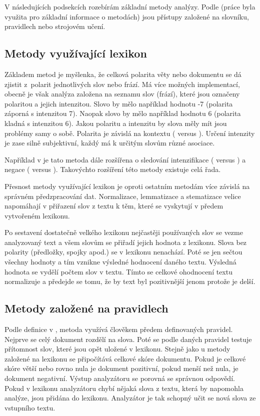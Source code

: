 V následujících podsekcích rozebírám základní metody analýzy. Podle \cite{approaches} (práce byla využita pro základní informace o metodách) jsou přístupy založené na slovníku, pravidlech nebo strojovém učení.


\subsection{Metody využívající lexikon}
Základem metod je myšlenka, že celková polarita věty nebo dokumentu se dá zjistit z~polarit jednotlivých slov nebo frází. Má více možných implementací, obecně je však analýza založena na seznamu slov (frází), které jsou označeny polaritou a jejich intenzitou. Slovo  by mělo například hodnotu -7 (polarita záporná s intenzitou 7). Naopak slovo  by mělo například hodnotu 6 (polarita kladná s intenzitou 6). 
Jakou polaritu a intenzitu by slova měly mít jsou problémy samy o sobě. Polarita je závislá na kontextu ( versus ). Určení intenzity je zase silně subjektivní, každý má k určitým slovům různé asociace.

Například v \cite{lexikon} je tato metoda dále rozšířena o sledování intenzifikace ( versus ) a negace ( versus ). Takovýchto rozšíření této metody existuje celá řada.

Přesnost metody využívající lexikon je oproti ostatním metodám více závislá na správném předzpracování dat. Normalizace, lemmatizace a stematizace velice napomáhají v přiřazení slov z textu k těm, které se vyskytují v předem vytvořeném lexikonu.

Po sestavení dostatečně velkého lexikonu nejčastěji používaných slov se vezme analyzovaný text a všem slovům se přiřadí jejich hodnota z lexikonu. Slova bez polarity (předložky, spojky apod.) se v lexikonu nenachází. Poté se jen sečtou všechny hodnoty a tím vznikne výsledné hodnocení daného textu. Výsledná hodnota se vydělí počtem slov v textu. Tímto se celkové ohodnocení textu normalizuje a předejde se tomu, že by text byl pozitivnější jenom protože je delší. 

\subsection{Metody založené na pravidlech}
Podle definice v \cite{approaches}, metoda využívá člověkem předem definovaných pravidel. Nejprve se celý dokument rozdělí na slova. Poté se podle daných pravidel testuje přítomnost slov, které jsou opět uložené v lexikonu. Stejně jako u metody založené na lexikonu se připočítává celkové skóre dokumentu. Pokud je celkové skóre větší nebo rovno nula je dokument pozitivní, pokud menší než nula, je dokument negativní. Výstup analyzátoru se porovná se správnou odpovědí. Pokud v lexikonu analyzátoru chybí nějaká slova z textu, která by napomohla analýze, jsou přidána do lexikonu. Analyzátor je tak schopný učit se nová slova ze vstupního textu.

